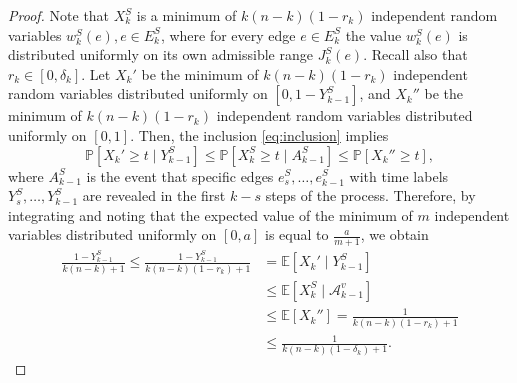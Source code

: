 \documentclass[a4paper,11pt]{article}
\theoremstyle{definition}
\theoremstyle{plain}
\newcommand{\A}{\mathcal A}
\newcommand{\prob}{\mathbb{P}}
\newcommand{\expect}{\mathbb{E}}
\begin{document}
\begin{proof}
  Note that $X_k^{S}$ is a minimum of $k(n-k)(1-r_k)$ independent random variables $w_k^{S}(e), e \in E_k^{S}$,
  where for every edge $e \in E_k^{S}$ the value $w_k^{S}(e)$ is distributed uniformly on its own
  admissible range $J_k^{S}(e)$. Recall also that $r_k\in[0,\delta_k]$.
  Let $X_k'$ be the minimum of $k(n-k)(1-r_k)$ independent random variables distributed uniformly on
  $\left[0, 1-Y_{k-1}^{S} \right]$, and $X_k''$ be the minimum of $k(n-k)(1-r_k)$ independent
  random variables distributed uniformly on $[0, 1]$.
  Then, the inclusion \eqref{eq:inclusion} implies
  \[
    \prob[X_k' \geq t \mid Y_{k-1}^S] \leq \prob[X_k^{S} \geq t \mid A_{k-1}^{S}] \leq \prob[X_k'' \geq t],
    \]
  where $A_{k-1}^{S}$ is the event that specific
  edges $e^S_{s}, \ldots, e^S_{k-1}$ with time labels $Y^S_{s}, \ldots, Y^S_{k-1}$ are revealed in the
  first $k-s$ steps of the process. Therefore, by integrating and noting that
  the expected value of the minimum of $m$ independent variables distributed uniformly on $[0,a]$ is equal to $\frac{a}{m+1}$,
  we obtain
  \begin{equation}
    \begin{split}
      \frac{1-Y_{k-1}^{S}}{k(n-k) + 1}
      \leq
      \frac{1-Y_{k-1}^{S}}{k(n-k)(1-r_k) + 1}
      &=
      \expect[ X_k' \mid Y_{k-1}^S]
      \\&\leq
      \expect[ X_k^{S} \mid \A^v_{k-1}]
      \\&\leq
      \expect[ X_k'']
      =
      \frac{1}{k(n-k)(1-r_k) + 1}
      \\&
      \leq
      \frac{1}{k(n-k)(1-\delta_k) + 1}.
    \end{split}
  \end{equation}


\end{proof}
\end{document}
